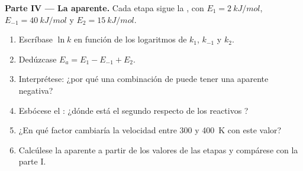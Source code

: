 \begin{problem}
\medskip
\noindent\textbf{Parte IV --- La  aparente.}
Cada etapa sigue la , con  $E_1 =
\qty{2}{kJ/mol}$, $E_{-1} = \qty{40}{kJ/mol}$ y $E_2 =
\qty{15}{kJ/mol}$.
\begin{enumerate}[resume]
  \item Escríbase $\ln k$ en función de los logaritmos de $k_1$, $k_{-1}$
        y $k_2$.
  \item Dedúzcase $E_a = E_1 - E_{-1} + E_2$.
  \item Interprétese: ¿por qué una combinación de 
        puede tener una  aparente negativa?
  \item Esbócese el : ¿dónde está el segundo  respecto de los reactivos ?
  \item ¿En qué factor cambiaría la velocidad entre 300 y \qty{400}{K}
        con este valor?
  \item Calcúlese la  aparente a partir de los
        valores de las etapas y compárese con la parte I.
\end{enumerate}
\end{problem}
